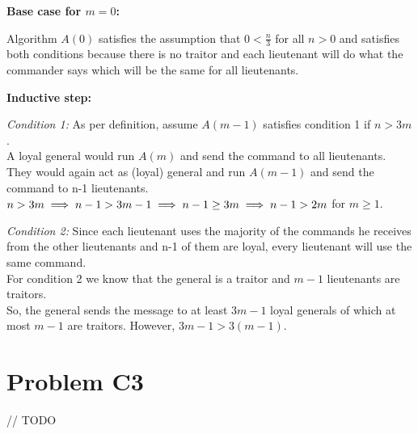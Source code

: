 \documentclass[12pt]{article}
\begin{document}
\textbf{Base case for $m=0$:} 

Algorithm $A(0)$ satisfies the assumption that $0 < \frac{n}{3}$ for all $n>0$ and satisfies both conditions because there is no traitor and each lieutenant will do what the commander says which will be the same for all lieutenants.

\textbf{Inductive step:}

\textit{Condition 1:} As per definition, assume $A(m-1)$ satisfies condition 1 if $n > 3m$.\\
A loyal general would run $A(m)$ and send the command to all lieutenants.\\
They would again act as (loyal) general and run $A(m-1)$ and send the command to n-1 lieutenants.\\
$n>3m\\
\implies n-1>3m-1 \\
\implies n-1\geq3m \\
\implies n-1>2m$ for $m\geq1$.

\textit{Condition 2:} Since each lieutenant uses the majority of the commands he receives from the other lieutenants and n-1 of them are loyal, every lieutenant will use the same command.\\
For condition 2 we know that the general is a traitor and $m-1$ lieutenants are traitors.\\
So, the general sends the message to at least $3m-1$ loyal generals of which at most $m-1$ are traitors. However, $3m-1 > 3(m-1)$. 

\section*{Problem C3}
// TODO
\end{document}
